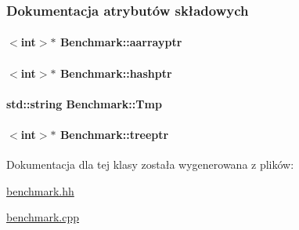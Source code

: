 \subsubsection{Dokumentacja atrybutów składowych}
\hypertarget{class_benchmark_a3bdbd0990bf2fe54258283e6e343f3f2}{
\paragraph[{aarrayptr}]{$<$int$>$$\ast$ Benchmark\-::aarrayptr\hspace{0.3cm}{\ttfamily [private]}}}\label{class_benchmark_a3bdbd0990bf2fe54258283e6e343f3f2}
\hypertarget{class_benchmark_a73d14cbb7e487ed246375c37aa182f65}{
\paragraph[{hashptr}]{$<$int$>$$\ast$ Benchmark\-::hashptr\hspace{0.3cm}{\ttfamily [private]}}}\label{class_benchmark_a73d14cbb7e487ed246375c37aa182f65}
\hypertarget{class_benchmark_aeca480b43b86f98b0d065ae910acdb8b}{
\paragraph[{Tmp}]{\setlength{\rightskip}{0pt plus 5cm}std\-::string Benchmark\-::\-Tmp\hspace{0.3cm}{\ttfamily [private]}}}\label{class_benchmark_aeca480b43b86f98b0d065ae910acdb8b}
\hypertarget{class_benchmark_a320c05da135d117cd23592bede8ed38b}{
\paragraph[{treeptr}]{$<$int$>$$\ast$ Benchmark\-::treeptr\hspace{0.3cm}{\ttfamily [private]}}}\label{class_benchmark_a320c05da135d117cd23592bede8ed38b}


Dokumentacja dla tej klasy została wygenerowana z plików\-:\begin{DoxyCompactItemize}
\item 
\hyperlink{benchmark_8hh}{benchmark.\-hh}\item 
\hyperlink{benchmark_8cpp}{benchmark.\-cpp}\end{DoxyCompactItemize}
